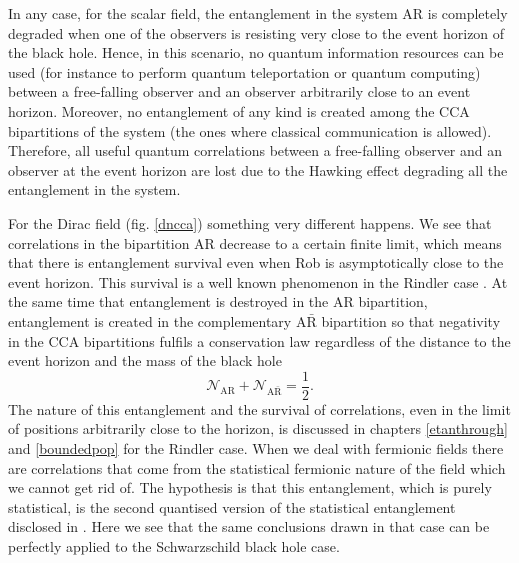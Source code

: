 In any case, for the scalar field, the entanglement in the system AR is
completely degraded when one of the observers is resisting very close to
the event horizon of the black hole. Hence, in this scenario, no quantum
information resources can be used (for instance to perform quantum
teleportation or quantum computing) between a free-falling observer and
an observer arbitrarily close to an event horizon. Moreover, no
entanglement of any kind is created among the CCA bipartitions of the
system (the ones where classical communication is allowed). Therefore, all useful
quantum correlations between a free-falling observer and an observer at
the event horizon are lost due to the Hawking effect degrading all the
entanglement in the system.



For the Dirac field  (fig. \ref{dncca}) something very different happens.
We see that correlations in the bipartition AR decrease to a certain
finite limit, which means that there is entanglement survival even when
Rob is asymptotically close to the event horizon. This survival is a well
known phenomenon in the Rindler case \cite{AlsingSchul}. At the
same time that entanglement is destroyed in the AR bipartition,
entanglement is created in the complementary $\text{A}\bar{\text{R}}$
bipartition so that negativity in the CCA bipartitions fulfils a
conservation law regardless of the distance to the event horizon and the
mass of the black hole
\begin{equation}\label{conservan}
\mathcal{N}_\text{AR}+\mathcal{N}_{\text{A}\bar{\text{R}}}=\frac12.
\end{equation}
The nature of this entanglement and the survival of correlations, even in
the limit of positions arbitrarily close to the horizon, is discussed in chapters \ref{etanthrough} and \ref{boundedpop} for the Rindler case. When we deal with fermionic
fields there are correlations that come from the statistical fermionic
nature of the field which we cannot get rid of. The hypothesis is that this
entanglement, which is purely statistical, is the second quantised version
of the statistical entanglement disclosed in \cite{sta1}. Here we see that
the same conclusions drawn in that case can be perfectly applied to the
Schwarzschild black hole case.

